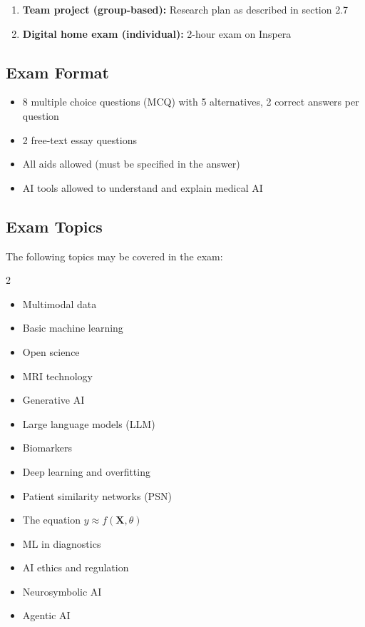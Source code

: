 \documentclass[11pt,a4paper]{article}
\begin{document}
\begin{enumerate}
    \item \textbf{Team project (group-based):} Research plan as described in section 2.7
    \item \textbf{Digital home exam (individual):} 2-hour exam on Inspera
\end{enumerate}

\subsection{Exam Format}

\begin{itemize}[nosep]
    \item 8 multiple choice questions (MCQ) with 5 alternatives, 2 correct answers per question
    \item 2 free-text essay questions
    \item All aids allowed (must be specified in the answer)
    \item AI tools allowed to understand and explain medical AI
\end{itemize}

\subsection{Exam Topics}

The following topics may be covered in the exam:

\begin{multicols}{2}
\begin{itemize}[nosep]
    \item Multimodal data
    \item Basic machine learning
    \item Open science
    \item MRI technology
    \item Generative AI
    \item Large language models (LLM)
    \item Biomarkers
    \item Deep learning and overfitting
    \item Patient similarity networks (PSN)
    \item The equation $y \approx f(\mathbf{X}, \theta)$
    \item ML in diagnostics
    \item AI ethics and regulation
    \item Neurosymbolic AI
    \item Agentic AI
\end{itemize}
\end{multicols}
\end{document}

